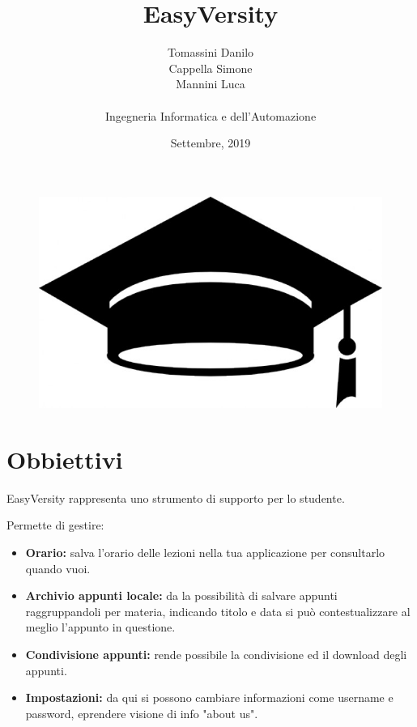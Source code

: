 \documentclass[a4paper, 50pt, twoside]{article}
\begin{document}
\title{EasyVersity}
\date{Settembre, 2019}
\author{Tomassini Danilo \\ Cappella Simone \\ Mannini Luca \\ \\ Ingegneria Informatica e dell'Automazione}
\maketitle
\vspace*{\fill}
\begin{figure}[h!]
	\centering
	\includegraphics[width=\linewidth]{copertina4.jpg}
	\label {fig::copertina}
\end{figure}
\vspace*{\fill}

\newpage
\tableofcontents{}

\newpage
\section{Obbiettivi}
EasyVersity rappresenta uno strumento di supporto per lo studente.

Permette di gestire:
\begin{itemize}
\item \textbf{Orario:} salva l'orario delle lezioni nella tua applicazione per consultarlo quando vuoi.
\item \textbf{Archivio appunti locale:} da la possibilità di salvare appunti raggruppandoli per materia, indicando titolo e data si può contestualizzare al meglio l'appunto in questione.
\item \textbf{Condivisione appunti:} rende possibile la condivisione ed il download degli appunti.
\item \textbf{Impostazioni:} da qui si possono cambiare informazioni come username e password, eprendere visione di info "about us".
\end{itemize}
\end{document}
